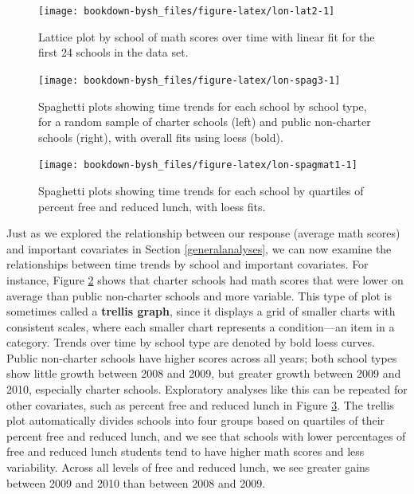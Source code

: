 \documentclass[
]{krantz}
\begin{document}
\begin{figure}

{\centering \texttt{[image: bookdown-bysh\_files/figure-latex/lon-lat2-1]} 

}

\caption{ Lattice plot by school of math scores over time with linear fit for the first 24 schools in the data set.}\label{fig:lon-lat2}
\end{figure}

\begin{figure}

{\centering \texttt{[image: bookdown-bysh\_files/figure-latex/lon-spag3-1]} 

}

\caption{Spaghetti plots showing time trends for each school by school type, for a random sample of charter schools (left) and public non-charter schools (right), with overall fits using loess (bold).}\label{fig:lon-spag3}
\end{figure}

\begin{figure}

{\centering \texttt{[image: bookdown-bysh\_files/figure-latex/lon-spagmat1-1]} 

}

\caption{Spaghetti plots showing time trends for each school by quartiles of percent free and reduced lunch, with loess fits.}\label{fig:lon-spagmat1}
\end{figure}

Just as we explored the relationship between our response (average math scores) and important covariates in Section \ref{generalanalyses}, we can now examine the relationships between time trends by school and important covariates. For instance, Figure \ref{fig:lon-spag3} shows that charter schools had math scores that were lower on average than public non-charter schools and more variable. This type of plot is sometimes called a \textbf{trellis graph},  since it displays a grid of smaller charts with consistent scales, where each smaller chart represents a condition---an item in a category. Trends over time by school type are denoted by bold loess curves. Public non-charter schools have higher scores across all years; both school types show little growth between 2008 and 2009, but greater growth between 2009 and 2010, especially charter schools. Exploratory analyses like this can be repeated for other covariates, such as percent free and reduced lunch in Figure \ref{fig:lon-spagmat1}. The trellis plot automatically divides schools into four groups based on quartiles of their percent free and reduced lunch, and we see that schools with lower percentages of free and reduced lunch students tend to have higher math scores and less variability. Across all levels of free and reduced lunch, we see greater gains between 2009 and 2010 than between 2008 and 2009.
\end{document}
